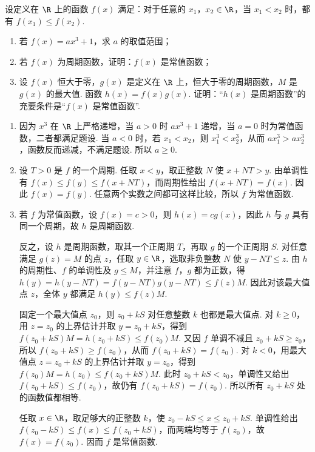 \begin{problem}
设定义在 \(\R\) 上的函数 \(f(x)\) 满足：对于任意的 \(x_1\)，\(x_2\in\R\)，当 \(x_1<x_2\) 时，都有 \(f(x_1)\le f(x_2)\).

\begin{enumerate}
\item 若 \(f(x)=ax^3+1\)，求 \(a\) 的取值范围；
\item 若 \(f(x)\) 为周期函数，证明：\(f(x)\) 是常值函数；
\item 设 \(f(x)\) 恒大于零，\(g(x)\) 是定义在 \(\R\) 上，恒大于零的周期函数，\(M\) 是 \(g(x)\) 的最大值. 函数 \(h(x)=f(x)g(x)\). 证明：“\(h(x)\) 是周期函数”的充要条件是“\(f(x)\) 是常值函数”.
\end{enumerate}
\end{problem}

\begin{solution}
\begin{enumerate}
\item 因为 \(x^3\) 在 \(\R\) 上严格递增，当 \(a>0\) 时 \(ax^3+1\) 递增，当 \(a=0\) 时为常值函数，二者都满足题设. 当 \(a<0\) 时，若 \(x_1<x_2\)，则 \(x_1^3<x_2^3\)，从而 \(ax_1^3>ax_2^3\)，函数反而递减，不满足题设. 所以 \(a\ge0\).
\item 设 \(T>0\) 是 \(f\) 的一个周期. 任取 \(x<y\)，取正整数 \(N\) 使 \(x+NT>y\). 由单调性有 \(f(x)\le f(y)\le f(x+NT)\)，而周期性给出 \(f(x+NT)=f(x)\). 因此 \(f(x)=f(y)\). 任意两个实数之间都可这样比较，所以 \(f\) 为常值函数.
\item 若 \(f\) 为常值函数，设 \(f(x)=c>0\)，则 \(h(x)=cg(x)\)，因此 \(h\) 与 \(g\) 具有同一个周期，故 \(h\) 是周期函数.

反之，设 \(h\) 是周期函数，取其一个正周期 \(T\)，再取 \(g\) 的一个正周期 \(S\). 对任意满足 \(g(z)=M\) 的点 \(z\)，任取 \(y\in\R\)，选取非负整数 \(N\) 使 \(y-NT\le z\). 由 \(h\) 的周期性、\(f\) 的单调性及 \(g\le M\)，并注意 \(f\)，\(g\) 都为正数，得 \(h(y)=h(y-NT)=f(y-NT)g(y-NT)\le f(z)M\). 因此对该最大值点 \(z\)，全体 \(y\) 都满足 \(h(y)\le f(z)M\).

固定一个最大值点 \(z_0\)，则 \(z_0+kS\) 对任意整数 \(k\) 也都是最大值点. 对 \(k\ge0\)，用 \(z=z_0\) 的上界估计并取 \(y=z_0+kS\)，得到 \(f(z_0+kS)M=h(z_0+kS)\le f(z_0)M\). 又因 \(f\) 单调不减且 \(z_0+kS\ge z_0\)，所以 \(f(z_0+kS)\ge f(z_0)\)，从而 \(f(z_0+kS)=f(z_0)\). 对 \(k<0\)，用最大值点 \(z=z_0+kS\) 的上界估计并取 \(y=z_0\)，得到 \(f(z_0)M=h(z_0)\le f(z_0+kS)M\). 此时 \(z_0+kS<z_0\)，单调性又给出 \(f(z_0+kS)\le f(z_0)\)，故仍有 \(f(z_0+kS)=f(z_0)\). 所以所有 \(z_0+kS\) 处的函数值都相等.

任取 \(x\in\R\)，取足够大的正整数 \(k\)，使 \(z_0-kS\le x\le z_0+kS\). 单调性给出 \(f(z_0-kS)\le f(x)\le f(z_0+kS)\)，而两端均等于 \(f(z_0)\)，故 \(f(x)=f(z_0)\). 因而 \(f\) 是常值函数.
\end{enumerate}
\end{solution}
